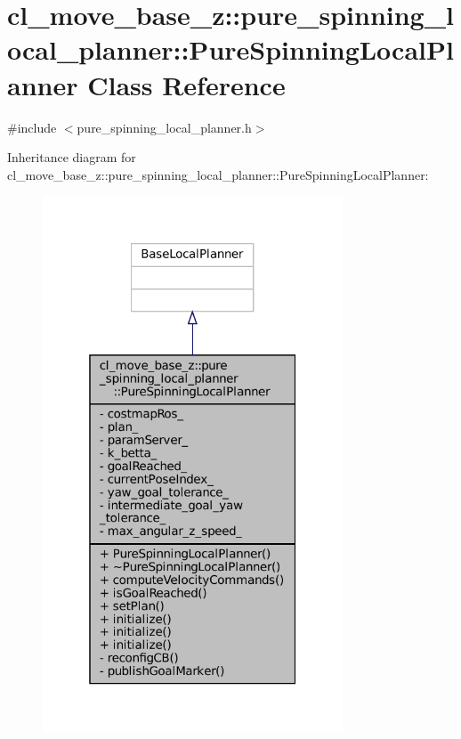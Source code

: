 \hypertarget{classcl__move__base__z_1_1pure__spinning__local__planner_1_1PureSpinningLocalPlanner}{}\section{cl\+\_\+move\+\_\+base\+\_\+z\+:\+:pure\+\_\+spinning\+\_\+local\+\_\+planner\+:\+:Pure\+Spinning\+Local\+Planner Class Reference}
\label{classcl__move__base__z_1_1pure__spinning__local__planner_1_1PureSpinningLocalPlanner}


{\ttfamily \#include $<$pure\+\_\+spinning\+\_\+local\+\_\+planner.\+h$>$}



Inheritance diagram for cl\+\_\+move\+\_\+base\+\_\+z\+:\+:pure\+\_\+spinning\+\_\+local\+\_\+planner\+:\+:Pure\+Spinning\+Local\+Planner\+:
\nopagebreak
\begin{figure}[H]
\begin{center}
\leavevmode
\includegraphics[width=253pt]{classcl__move__base__z_1_1pure__spinning__local__planner_1_1PureSpinningLocalPlanner__inherit__graph}
\end{center}
\end{figure}


